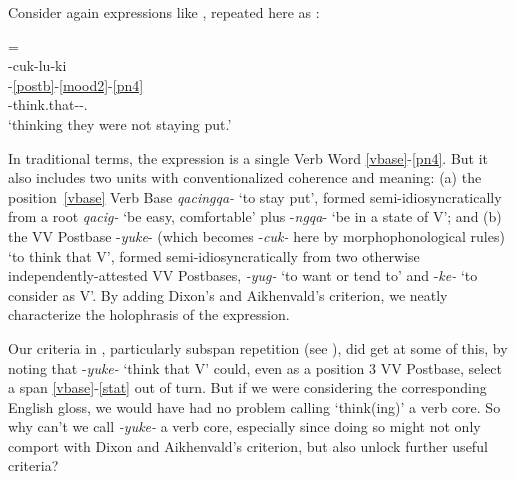 \documentclass[output=paper]{langscibook}
\begin{document}
Consider again expressions like , repeated here as :

\ea\label{ex:key:52} {= }\\
-cuk-lu-ki\\
    [\ref{vbase}--\ref{stat}]-\ref{postb}-\ref{mood2}-\ref{pn4} \\
     [stay.put-not-]-think.that-\Appos-\Tpl.\Obj{} \\
\glt `thinking they were not staying put.'
\z

In traditional terms, the expression is a single Verb Word \ref{vbase}-\ref{pn4}. But it also includes two units with conventionalized coherence and meaning: (a) the position~\ref{vbase} Verb Base \textit{qacingqa-} `to stay put', formed semi-idiosyncratically from a root \textit{qacig-} `be easy, comfortable' plus -\textit{ngqa}{}- `be in a state of V'; and (b) the VV Postbase -\textit{yuke}{}- (which becomes -\textit{cuk-} here by morphophonological rules) `to think that V', formed semi-idiosyncratically from two otherwise independently-attested VV Postbases, \textit{{}-yug-} `to want or tend to' and -\textit{ke-} `to consider as V'. By adding Dixon's and Aikhenvald's criterion, we neatly characterize the holophrasis of the expression.

Our criteria in , particularly subspan repetition (see ), did get at some of this, by noting that -\textit{yuke-} `think that V' could, even as a position 3 VV Postbase, select a span \ref{vbase}-\ref{stat} out of turn. But if we were considering the corresponding English gloss, we would have had no problem calling `think(ing)' a verb core. So why can't we call \textit{{}-yuke-} a verb core, especially since doing so might not only comport with Dixon and Aikhenvald's criterion, but also unlock further useful criteria?
\end{document}
